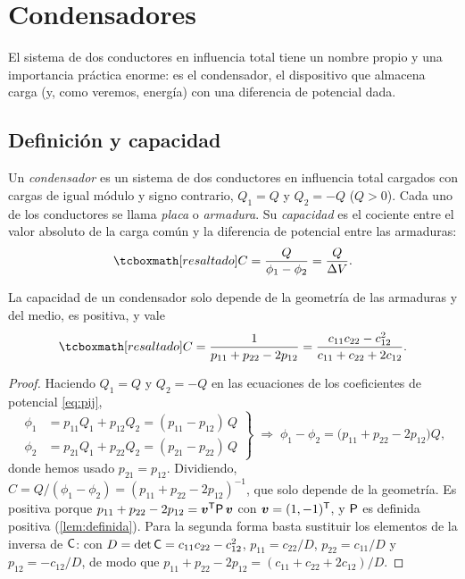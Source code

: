 \section{Condensadores}\label{sec:condensadores}
El sistema de dos conductores en influencia total tiene un nombre propio y una importancia práctica enorme: es el condensador, el dispositivo que
almacena carga (y, como veremos, energía) con una diferencia de potencial dada.

\subsection{Definición y capacidad}\label{sec:condensador-def}
\begin{definicion}[Condensador]\label{def:condensador}
Un \emph{condensador} es un sistema de dos conductores en influencia total cargados con cargas de igual módulo y signo contrario, $Q_1=Q$ y
$Q_2=-Q$ ($Q>0$). Cada uno de los conductores se llama \emph{placa} o \emph{armadura}. Su \emph{capacidad} es el cociente entre el valor absoluto de la carga
común y la diferencia de potencial entre las armaduras:
\begin{equation}\label{eq:cap-condensador}
  \resalta{C=\frac{Q}{\phi_1-\phi_2}=\frac{Q}{\DV} .}
\end{equation}
\end{definicion}

\begin{teorema}\label{teo:cap-coef}
La capacidad de un condensador solo depende de la geometría de las armaduras y del medio, es positiva, y vale
\begin{equation}\label{eq:cap-coef}
  \resalta{C=\frac{1}{p_{11}+p_{22}-2p_{12}}=\frac{c_{11}c_{22}-c_{12}^{2}}{c_{11}+c_{22}+2c_{12}} .}
\end{equation}
\end{teorema}
\begin{proof}
Haciendo $Q_1=Q$ y $Q_2=-Q$ en las ecuaciones de los coeficientes de potencial \cref{eq:pij},
\[
  \left.\begin{aligned}
    \phi_1&=p_{11}Q_1+p_{12}Q_2=(p_{11}-p_{12})\,Q\\
    \phi_2&=p_{21}Q_1+p_{22}Q_2=(p_{21}-p_{22})\,Q
  \end{aligned}\right\}
  \;\Longrightarrow\;\phi_1-\phi_2=\bigl(p_{11}+p_{22}-2p_{12}\bigr)Q ,
\]
donde hemos usado $p_{21}=p_{12}$. Dividiendo, $C=Q/(\phi_1-\phi_2)=(p_{11}+p_{22}-2p_{12})^{-1}$, que solo depende de la geometría. Es positiva porque
$p_{11}+p_{22}-2p_{12}=\bm{v}^{\mathsf{T}}\mathsf{P}\,\bm{v}$ con $\bm{v}=(1,-1)^{\mathsf{T}}$, y $\mathsf{P}$ es definida positiva (\cref{lem:definida}). Para la segunda forma basta sustituir
los elementos de la inversa de $\mathsf{C}$: con $D=\det\mathsf{C}=c_{11}c_{22}-c_{12}^{2}$, $p_{11}=c_{22}/D$, $p_{22}=c_{11}/D$ y $p_{12}=-c_{12}/D$, de modo que
$p_{11}+p_{22}-2p_{12}=(c_{11}+c_{22}+2c_{12})/D$.
\end{proof}

